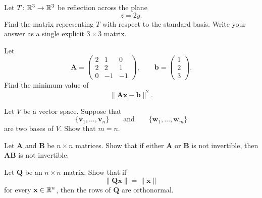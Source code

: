 \begin{problem}
Let $T\colon \mathbb{R}^3\to\mathbb{R}^3$ be reflection across the plane
\[
z=2y.
\]
Find the matrix representing $T$ with respect to the standard basis. Write your answer as a single explicit $3\times3$ matrix.
\end{problem}

\begin{problem}
Let
\[
\mathbf A=
\begin{pmatrix}
2&1&0\\
2&2&1\\
0&-1&-1
\end{pmatrix},
\qquad
\mathbf b=
\begin{pmatrix}
1\\2\\3
\end{pmatrix}.
\]
Find the minimum value of
\[
\|\mathbf A\mathbf x-\mathbf b\|^2.
\]
\end{problem}

\begin{problem}
Let $V$ be a vector space. Suppose that
\[
\{\mathbf v_1,\dots,\mathbf v_n\}
\qquad\text{and}\qquad
\{\mathbf w_1,\dots,\mathbf w_m\}
\]
are two bases of $V$. Show that $m=n$.
\end{problem}

\begin{problem}
Let $\mathbf A$ and $\mathbf B$ be $n\times n$ matrices. Show that if either $\mathbf A$ or $\mathbf B$ is not invertible, then $\mathbf A\mathbf B$ is not invertible.
\end{problem}

\begin{problem}
Let $\mathbf Q$ be an $n\times n$ matrix. Show that if
\[
\|\mathbf Q\mathbf x\|=\|\mathbf x\|
\]
for every $\mathbf x\in\mathbb{R}^n$, then the rows of $\mathbf Q$ are orthonormal.
\end{problem}

